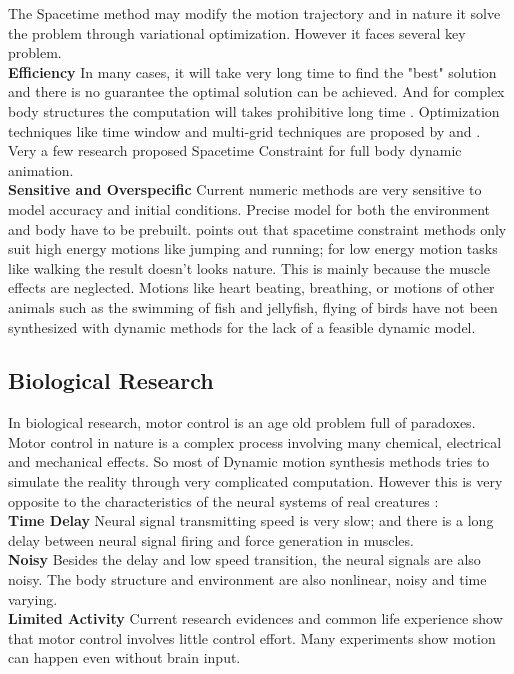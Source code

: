 The Spacetime method may modify the motion trajectory and in nature it solve the problem through variational optimization. However it faces several key problem.\\
\textbf{Efficiency}
In many cases, it will take very long time to find the "best" solution and there is no guarantee the optimal solution can be achieved. And for complex body structures the computation will takes prohibitive long time \citep{Anderson2001}. Optimization techniques like time window and multi-grid techniques are proposed by \citet{Cohen1992} and \citet{Liu1994}. Very a few research \citep{Popovi'c1999} proposed Spacetime Constraint for full body dynamic animation.\\
\textbf{Sensitive and Overspecific}
Current numeric methods are very sensitive to model accuracy and initial conditions. Precise model for both the environment and body have to be prebuilt. \citet{Liu2005} points out that spacetime constraint methods only suit high energy motions like jumping and running; for low energy motion tasks like walking the result doesn't looks nature. This is mainly because the muscle effects are neglected. Motions like heart beating, breathing, or motions of other animals such as the swimming of fish and jellyfish, flying of birds have not been synthesized with dynamic methods for the lack of a feasible dynamic model. 


\subsection{Biological Research}
In biological research, motor control is an age old problem full of paradoxes. Motor control in nature is a complex process involving many chemical, electrical and mechanical effects. So most of Dynamic motion synthesis methods tries to simulate the reality through very complicated computation. However this is very opposite to the characteristics of the neural systems of real creatures \citep{Glynn2003}: \\
\textbf{Time Delay}
Neural signal transmitting speed is very slow; and there is a long delay between neural signal firing and force generation in muscles.\\ 
\textbf{Noisy}
Besides the delay and low speed transition, the neural signals are also noisy. The body structure and environment are also nonlinear, noisy and time varying. \\
\textbf{Limited Activity}
Current research evidences and common life experience show that motor control involves little control effort. Many experiments show motion can happen even without brain input. 

